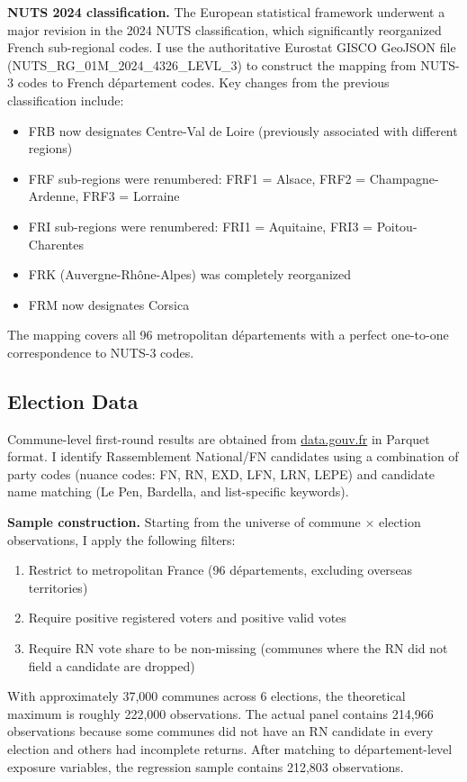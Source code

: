 \documentclass[12pt]{article}
\newcommand{\rn}{Rassemblement National}
\newcommand{\dept}{d\'{e}partement}
\newcommand{\depts}{d\'{e}partements}
\begin{document}
\textbf{NUTS 2024 classification.} The European statistical framework underwent a major revision in the 2024 NUTS classification, which significantly reorganized French sub-regional codes. I use the authoritative Eurostat GISCO GeoJSON file (NUTS\_RG\_01M\_2024\_4326\_LEVL\_3) to construct the mapping from NUTS-3 codes to French \dept{} codes. Key changes from the previous classification include:
\begin{itemize}
    \item FRB now designates Centre-Val de Loire (previously associated with different regions)
    \item FRF sub-regions were renumbered: FRF1 = Alsace, FRF2 = Champagne-Ardenne, FRF3 = Lorraine
    \item FRI sub-regions were renumbered: FRI1 = Aquitaine, FRI3 = Poitou-Charentes
    \item FRK (Auvergne-Rh\^{o}ne-Alpes) was completely reorganized
    \item FRM now designates Corsica
\end{itemize}

The mapping covers all 96 metropolitan \depts{} with a perfect one-to-one correspondence to NUTS-3 codes.

\subsection{Election Data}

Commune-level first-round results are obtained from \url{data.gouv.fr} in Parquet format. I identify \rn{}/FN candidates using a combination of party codes (nuance codes: FN, RN, EXD, LFN, LRN, LEPE) and candidate name matching (Le Pen, Bardella, and list-specific keywords).

\textbf{Sample construction.} Starting from the universe of commune $\times$ election observations, I apply the following filters:
\begin{enumerate}
    \item Restrict to metropolitan France (96 \depts{}, excluding overseas territories)
    \item Require positive registered voters and positive valid votes
    \item Require RN vote share to be non-missing (communes where the RN did not field a candidate are dropped)
\end{enumerate}

With approximately 37,000 communes across 6 elections, the theoretical maximum is roughly 222,000 observations. The actual panel contains 214,966 observations because some communes did not have an RN candidate in every election and others had incomplete returns. After matching to \dept{}-level exposure variables, the regression sample contains 212,803 observations.
\end{document}
